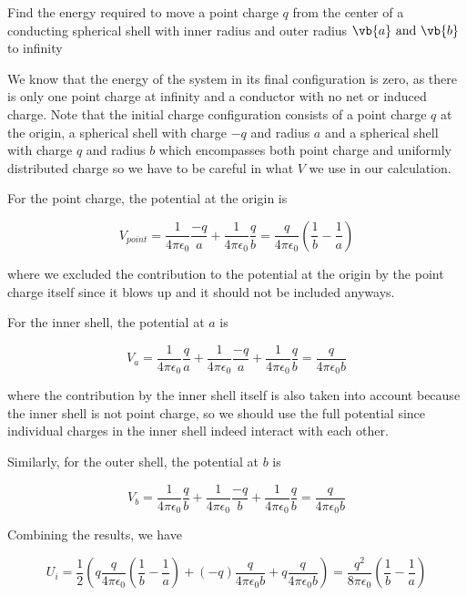 \documentclass[english,a4paper,12pt]{report}
\begin{document}
{Find the energy required to move a point charge  \(q\) from the center of a conducting spherical shell with inner radius and outer radius \(\vb{a} \text { and } \vb{b} \) to infinity}
{We know that the energy of the system in its final configuration is zero, as there is only one point charge at infinity and a conductor with no net or induced charge. Note that the initial charge configuration consists of a point charge \(q\) at the origin, a spherical shell with charge \(-q\) and radius \(a\) and a spherical shell with charge \(q\) and radius \(b\) which encompasses both point charge and uniformly distributed charge so we have to be careful in what \(V\) we use in our calculation.
    
For the point charge, the potential at the origin is 

\begin{equation}
    V_{point} = \frac{1}{4\pi\epsilon_0} \frac{-q}{a} + \frac{1}{4\pi\epsilon_0} \frac{q}{b}  = \frac{q}{4\pi \epsilon_0} \left(\frac{1}{b} - \frac{1}{a} \right)
\end{equation}

where we excluded the contribution to the potential at the origin by the point charge itself since it blows up and it should not be included anyways.

For the inner shell, the potential at \(a\) is

\begin{equation}
    V_{a} = \frac{1}{4\pi\epsilon_0} \frac{q}{a} + \frac{1}{4\pi\epsilon_0} \frac{-q}{a}  + \frac{1}{4\pi\epsilon_0} \frac{q}{b} = \frac{q}{4\pi \epsilon_0 b} 
\end{equation}

where the contribution by the inner shell itself is also taken into account because the inner shell is not point charge, so we should use the full potential since individual charges in the inner shell indeed interact with each other.

Similarly, for the outer shell, the potential at \(b\) is

\begin{equation}
    V_{b} = \frac{1}{4\pi\epsilon_0} \frac{q}{b} + \frac{1}{4\pi\epsilon_0} \frac{-q}{b} + \frac{1}{4\pi\epsilon_0} \frac{q}{b}  = \frac{q}{4\pi \epsilon_0 b}   
\end{equation}

Combining the results, we have 

\begin{equation}
    U_{i} = \frac{1}{2} \left(q\frac{q}{4\pi \epsilon_0} \left(\frac{1}{b} - \frac{1}{a} \right) + (-q)\frac{q}{4\pi \epsilon_0 b} + q \frac{q}{4\pi \epsilon_0 b}\right) = \frac{q^2}{8\pi \epsilon_0} \left(\frac{1}{b} - \frac{1}{a} \right) 
\end{equation}

}
\end{document}
